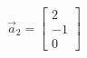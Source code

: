 \documentclass[preview]{standalone}
\begin{document}
\begin{align*}
\vec{a}_2=\begin{bmatrix} 2 \\ -1 \\ 0 \end{bmatrix}
\end{align*}
\end{document}
